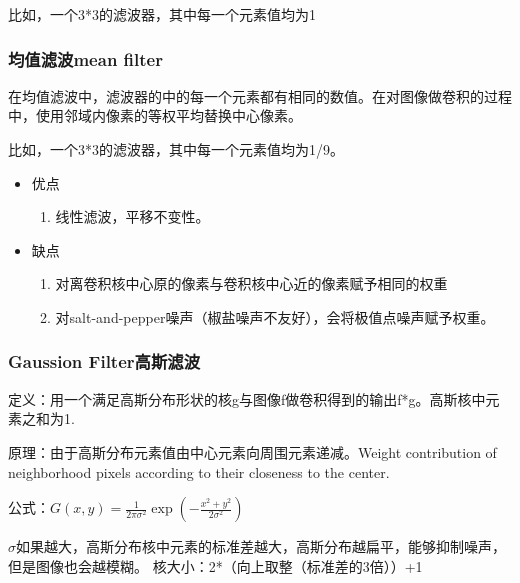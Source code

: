 \documentclass[UTF8]{ctexart}
\begin{document}
比如，一个3*3的滤波器，其中每一个元素值均为1

\subsubsection{均值滤波mean filter}
在均值滤波中，滤波器的中的每一个元素都有相同的数值。在对图像做卷积的过程中，使用邻域内像素的等权平均替换中心像素。

比如，一个3*3的滤波器，其中每一个元素值均为1/9。

\begin{itemize}
    \item 优点
    \begin{enumerate}
        \item 线性滤波，平移不变性。
    \end{enumerate}
    \item 缺点
    \begin{enumerate}
        \item 对离卷积核中心原的像素与卷积核中心近的像素赋予相同的权重
        \item 对salt-and-pepper噪声（椒盐噪声不友好），会将极值点噪声赋予权重。
    \end{enumerate}
\end{itemize}

\subsubsection{Gaussion Filter高斯滤波}
定义：用一个满足高斯分布形状的核g与图像f做卷积得到的输出f*g。高斯核中元素之和为1.

原理：由于高斯分布元素值由中心元素向周围元素递减。Weight contribution of neighborhood pixels according to their closeness to the center.

公式：$G(x,y) = \frac{1}{2\pi\sigma^2}\exp\!\left(-\frac{x^2 + y^2}{2\sigma^2}\right)$

$\sigma$如果越大，高斯分布核中元素的标准差越大，高斯分布越扁平，能够抑制噪声，但是图像也会越模糊。
核大小：2*（向上取整（标准差的3倍））+1
\end{document}
